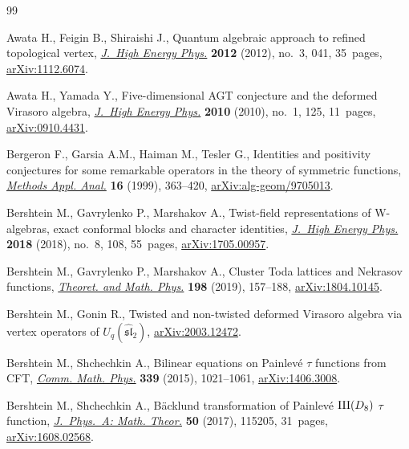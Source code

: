 \documentclass[pdftex]{sigma}
\numberwithin{equation}{section}
\theoremstyle{definition}
\begin{document}
\begin{thebibliography}{99}
\footnotesize\itemsep=0pt

Awata H., Feigin B., Shiraishi J., Quantum algebraic approach to refined
 topological vertex, \href{https://doi.org/10.1007/JHEP03(2012)041}{\textit{J.~High Energy Phys.}} \textbf{2012} (2012),
 no.~3, 041, 35~pages, \href{https://arxiv.org/abs/1112.6074}{arXiv:1112.6074}.

Awata H., Yamada Y., Five-dimensional {AGT} conjecture and the deformed
 {V}irasoro algebra, \href{https://doi.org/10.1007/JHEP01(2010)125}{\textit{J.~High Energy Phys.}} \textbf{2010} (2010),
 no.~1, 125, 11~pages, \href{https://arxiv.org/abs/0910.4431}{arXiv:0910.4431}.

Bergeron F., Garsia A.M., Haiman M., Tesler G., Identities and positivity
 conjectures for some remarkable operators in the theory of symmetric
 functions, \href{https://doi.org/10.4310/MAA.1999.v6.n3.a7}{\textit{Methods Appl. Anal.}} \textbf{16} (1999), 363--420, \href{https://arxiv.org/abs/alg-geom/9705013}{arXiv:alg-geom/9705013}.

Bershtein M., Gavrylenko P., Marshakov A., Twist-field representations of
 {W}-algebras, exact conformal blocks and character identities,
 \href{https://doi.org/10.1007/jhep08(2018)108}{\textit{J.~High Energy Phys.}} \textbf{2018} (2018), no.~8, 108, 55~pages,
 \href{https://arxiv.org/abs/1705.00957}{arXiv:1705.00957}.

Bershtein M., Gavrylenko P., Marshakov A., Cluster {T}oda lattices and
 {N}ekrasov functions, \href{https://doi.org/10.1134/S0040577919020016}{\textit{Theoret. and Math. Phys.}} \textbf{198} (2019),
 157--188, \href{https://arxiv.org/abs/1804.10145}{arXiv:1804.10145}.

Bershtein M., Gonin R., Twisted and non-twisted deformed {V}irasoro algebra via
 vertex operators of ${U}_q(\widehat{\mathfrak{sl}}_2)$, \href{https://arxiv.org/abs/2003.12472}{arXiv:2003.12472}.

Bershtein M., Shchechkin A., Bilinear equations on {P}ainlev\'e {$\tau$}
 functions from {CFT}, \href{https://doi.org/10.1007/s00220-015-2427-4}{\textit{Comm. Math. Phys.}} \textbf{339} (2015),
 1021--1061, \href{https://arxiv.org/abs/1406.3008}{arXiv:1406.3008}.

Bershtein M., Shchechkin A., B\"acklund transformation of {P}ainlev\'e {${\rm
 III}(D_8)$} {$\tau$} function, \href{https://doi.org/10.1088/1751-8121/aa59c9}{\textit{J.~Phys.~A: Math. Theor.}} \textbf{50}
 (2017), 115205, 31~pages, \href{https://arxiv.org/abs/1608.02568}{arXiv:1608.02568}.


\end{thebibliography}
\end{document}
